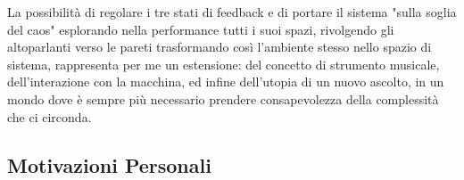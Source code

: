 \vspace{0.5cm}

La possibilità di regolare i tre stati di feedback e di portare il sistema "sulla soglia del caos"
esplorando nella performance tutti i suoi spazi, 
rivolgendo gli altoparlanti verso le pareti trasformando così l'ambiente stesso
nello spazio di sistema, rappresenta per me un estensione: del concetto di strumento musicale, 
dell'interazione con la macchina, ed infine dell'utopia di un nuovo ascolto,
in un mondo dove è sempre più necessario prendere consapevolezza della complessità che ci circonda.

\subsection{Motivazioni Personali}
\label{Motivazioni Personali}

